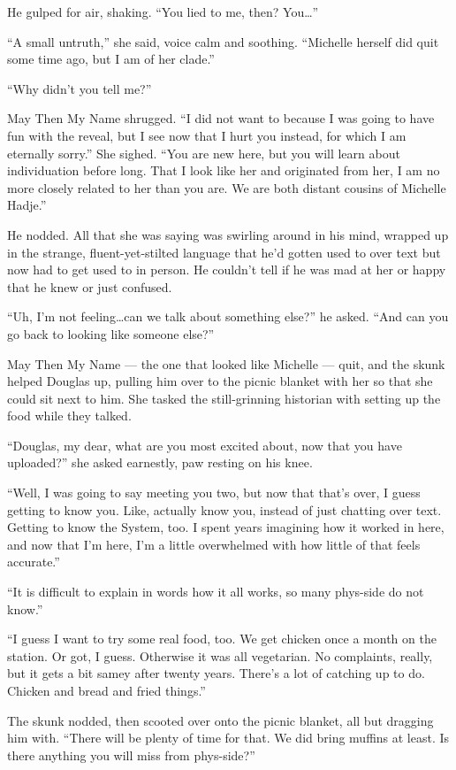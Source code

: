 He gulped for air, shaking. ``You lied to me, then? You\ldots{}''

``A small untruth,'' she said, voice calm and soothing. ``Michelle herself did quit some time ago, but I am of her clade.''

``Why didn't you tell me?''

May Then My Name shrugged. ``I did not want to because I was going to have fun with the reveal, but I see now that I hurt you instead, for which I am eternally sorry.'' She sighed. ``You are new here, but you will learn about individuation before long. That I look like her and originated from her, I am no more closely related to her than you are. We are both distant cousins of Michelle Hadje.''

He nodded. All that she was saying was swirling around in his mind, wrapped up in the strange, fluent-yet-stilted language that he'd gotten used to over text but now had to get used to in person. He couldn't tell if he was mad at her or happy that he knew or just confused.

``Uh, I'm not feeling\ldots can we talk about something else?'' he asked. ``And can you go back to looking like someone else?''

May Then My Name — the one that looked like Michelle — quit, and the skunk helped Douglas up, pulling him over to the picnic blanket with her so that she could sit next to him. She tasked the still-grinning historian with setting up the food while they talked.

``Douglas, my dear, what are you most excited about, now that you have uploaded?'' she asked earnestly, paw resting on his knee.

``Well, I was going to say meeting you two, but now that that's over, I guess getting to know you. Like, actually know you, instead of just chatting over text. Getting to know the System, too. I spent years imagining how it worked in here, and now that I'm here, I'm a little overwhelmed with how little of that feels accurate.''

``It is difficult to explain in words how it all works, so many phys-side do not know.''

``I guess I want to try some real food, too. We get chicken once a month on the station. Or got, I guess. Otherwise it was all vegetarian. No complaints, really, but it gets a bit samey after twenty years. There's a lot of catching up to do. Chicken and bread and fried things.''

The skunk nodded, then scooted over onto the picnic blanket, all but dragging him with. ``There will be plenty of time for that. We did bring muffins at least. Is there anything you will miss from phys-side?''

